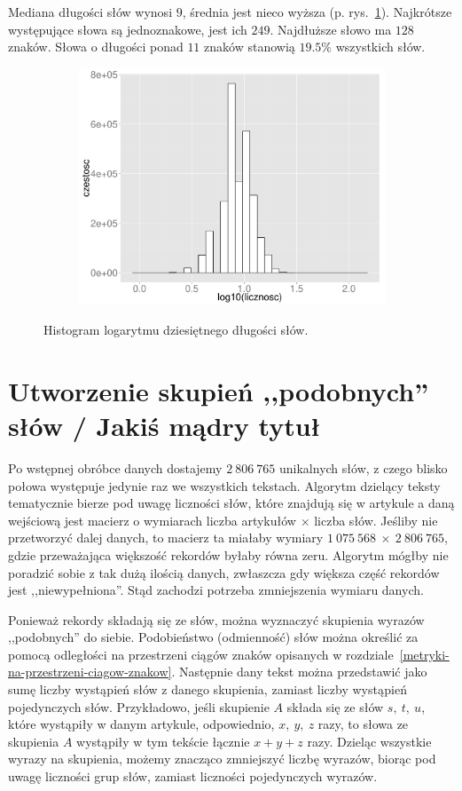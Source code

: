 \documentclass{praca1}
\begin{document}
Mediana długości słów wynosi $9$, średnia jest nieco wyższa (p. rys.~\ref{plot:003}). Najkrótsze występujące słowa są jednoznakowe, jest ich $249$. Najdłuższe słowo ma $128$ znaków. Słowa o długości ponad $11$ znaków stanowią $19.5\%$ wszystkich słów.

\begin{figure}[!h]
  \centering
  \includegraphics[width=350pt, height=200pt]{plot3.pdf}\\
  \caption{Histogram logarytmu dziesiętnego długości słów.}\label{plot:003}
\end{figure}


\section{Utworzenie skupień ,,podobnych'' słów / Jakiś mądry tytuł}

Po wstępnej obróbce danych dostajemy $2\ 806\ 765$ unikalnych słów, z czego blisko połowa występuje jedynie raz we wszystkich tekstach. Algorytm dzielący teksty tematycznie bierze pod uwagę liczności słów, które znajdują się w artykule a daną wejściową jest macierz o wymiarach liczba artykułów $\times$ liczba słów. Jeśliby nie przetworzyć dalej danych, to macierz ta miałaby wymiary $1\ 075\ 568\ \times\ 2\ 806\ 765$, gdzie przeważająca większość rekordów byłaby równa zeru. Algorytm mógłby nie poradzić sobie z tak dużą ilością danych, zwłaszcza gdy większa część rekordów jest ,,niewypełniona''. Stąd zachodzi potrzeba zmniejszenia wymiaru danych. 

Ponieważ rekordy składają się ze słów, można wyznaczyć skupienia wyrazów ,,podobnych'' do siebie. Podobieństwo (odmienność) słów można określić za pomocą odległości na przestrzeni ciągów znaków opisanych w rozdziale~\ref{metryki-na-przestrzeni-ciagow-znakow}. Następnie dany tekst można przedstawić jako sumę liczby wystąpień słów z danego skupienia, zamiast liczby wystąpień pojedynczych słów. Przykładowo, jeśli skupienie $A$ składa się ze słów $s,\ t,\ u$, które wystąpiły w danym artykule, odpowiednio, $x,\ y,\ z$ razy, to słowa ze skupienia $A$ wystąpiły w tym tekście łącznie $x+y+z$ razy. Dzieląc wszystkie wyrazy na skupienia, możemy znacząco zmniejszyć liczbę wyrazów, biorąc pod uwagę liczności grup słów, zamiast liczności pojedynczych wyrazów.
\end{document}
